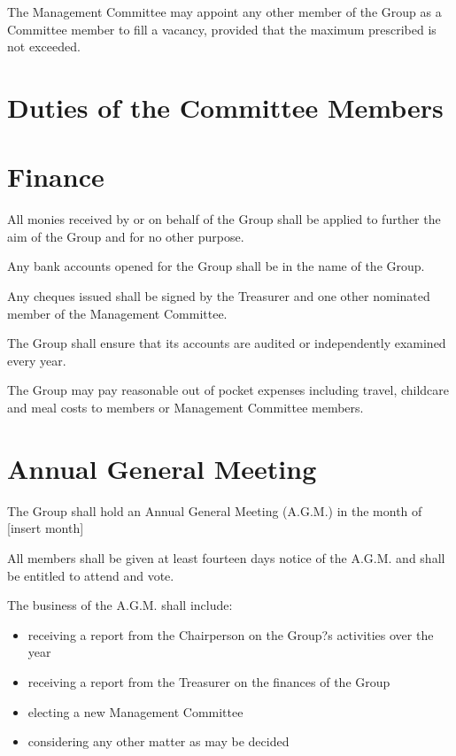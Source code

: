 \documentclass[a4paper, 12pt]{report}
\begin{document}
The Management Committee may appoint any other member of the Group as a Committee member to fill a vacancy, provided that the maximum prescribed is not exceeded.


\section{Duties of the Committee Members}

\section{Finance}

All monies received by or on behalf of the Group shall be applied to further the aim of the Group and for no other purpose.

Any bank accounts opened for the Group shall be in the name of the Group.

Any cheques issued shall be signed by the Treasurer and one other nominated member of the Management Committee.

The Group shall ensure that its accounts are audited or independently examined every year.

The Group may pay reasonable out of pocket expenses including travel, childcare and meal costs to members or Management Committee members.




\section{Annual General Meeting}

The Group shall hold an Annual General Meeting (A.G.M.) in the month of [insert month]

All members shall be given at least fourteen days notice of the A.G.M. and shall be entitled to attend and vote.

The business of the A.G.M. shall include:

\begin{itemize}
\item{receiving a report from the Chairperson on the Group?s activities over the year}
\item{receiving a report from the Treasurer on the finances of the Group}
\item{electing a new Management Committee}
\item{considering any other matter as may be decided}
\end{itemize}
\end{document}
